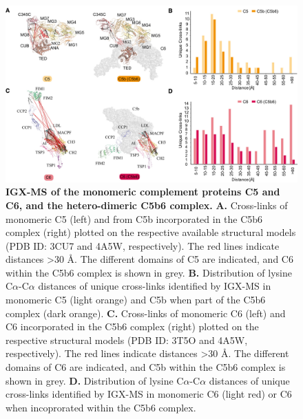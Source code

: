 \begin{figure}[b!]
\center
\includegraphics[width=\textwidth]{Chapter.2/Figures/Fig5.jpg} 
\caption{\textbf{IGX-MS of the monomeric complement proteins C5 and C6, and the hetero-dimeric C5b6 complex.} \textbf{A.} Cross-links of monomeric C5 (left) and from C5b incorporated in the C5b6 complex (right) plotted on the respective available structural models (PDB ID: 3CU7 and 4A5W, respectively). The red lines indicate distances >30 Å. The different domains of C5 are indicated, and C6 within the C5b6 complex is shown in grey. \textbf{B.} Distribution of lysine C$\alpha$-C$\alpha$ distances of unique cross-links identified by IGX-MS in monomeric C5 (light orange) and C5b when part of the C5b6 complex (dark orange). \textbf{C.} Cross-links of monomeric C6 (left) and C6 incorporated in the C5b6 complex (right) plotted on the respective structural models (PDB ID: 3T5O and 4A5W, respectively). The red lines indicate distances >30 Å. The different domains of C6 are indicated, and C5b within the C5b6 complex is shown in grey. \textbf{D.} Distribution of lysine C$\alpha$-C$\alpha$ distances of unique cross-links identified by IGX-MS in monomeric C6 (light red) or C6 when incoprorated within the C5b6 complex.}
\label{fig:ch2_fig5}
\end{figure}
\clearpage


